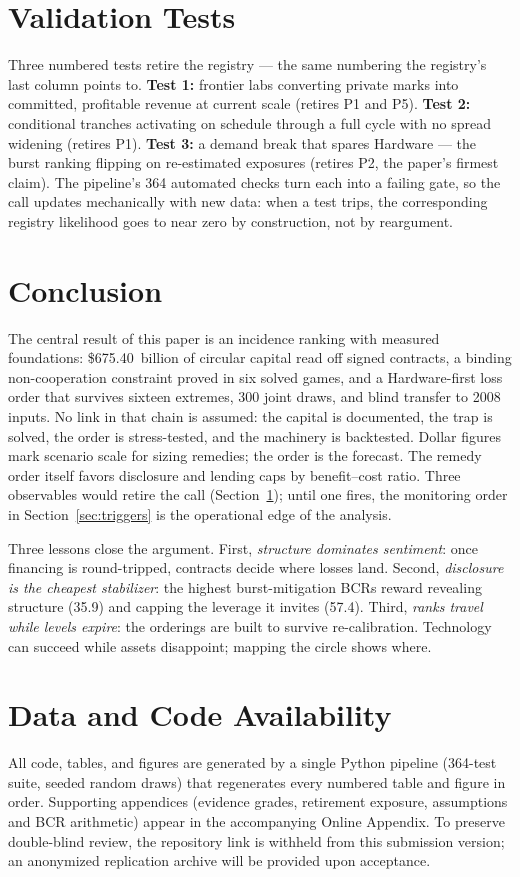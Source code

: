 \documentclass[11pt,a4paper]{article}
\begin{document}
\section{Validation Tests}\label{sec:validation}
Three numbered tests retire the registry --- the same numbering the
registry's last column points to. \textbf{Test 1:} frontier labs converting
private marks into committed, profitable revenue at current scale (retires
P1 and P5). \textbf{Test 2:} conditional tranches activating on schedule
through a full cycle with no spread widening (retires P1). \textbf{Test 3:}
a demand break that spares Hardware --- the burst ranking flipping on
re-estimated exposures (retires P2, the paper's firmest claim). The
pipeline's 364 automated checks turn each into a failing gate, so the
call updates mechanically with new data: when a test trips, the
corresponding registry likelihood goes to near zero by construction, not by
reargument.

\section{Conclusion}
The central result of this paper is an incidence ranking with measured
foundations: \$675.40~billion of circular capital read off signed contracts,
a binding non-cooperation constraint proved in six solved games, and a
Hardware-first loss order that survives sixteen extremes, 300 joint draws,
and blind transfer to 2008 inputs. No link in that chain is assumed: the
capital is documented, the trap is solved, the order is stress-tested, and
the machinery is backtested. Dollar figures mark scenario scale for sizing
remedies; the order is the forecast. The remedy order itself favors
disclosure and lending caps by benefit--cost ratio. Three observables would
retire the call (Section~\ref{sec:validation}); until one fires, the
monitoring order in Section~\ref{sec:triggers} is the operational edge
of the analysis.

Three lessons close the argument. First, \emph{structure dominates
sentiment}: once financing is round-tripped, contracts decide where losses
land. Second, \emph{disclosure is the cheapest stabilizer}: the highest
burst-mitigation BCRs reward revealing structure (35.9) and capping the
leverage it invites (57.4). Third, \emph{ranks travel while levels expire}:
the orderings are built to survive re-calibration. Technology can succeed
while assets disappoint; mapping the circle shows where.


\section*{Data and Code Availability}
All code, tables, and figures are generated by a single Python pipeline
(364-test suite, seeded random draws) that regenerates every numbered
table and figure in order. Supporting appendices (evidence grades,
retirement exposure, assumptions and BCR arithmetic) appear in the
accompanying Online Appendix. To preserve double-blind review, the
repository link is withheld from this submission version; an anonymized
replication archive will be provided upon acceptance.
\end{document}
